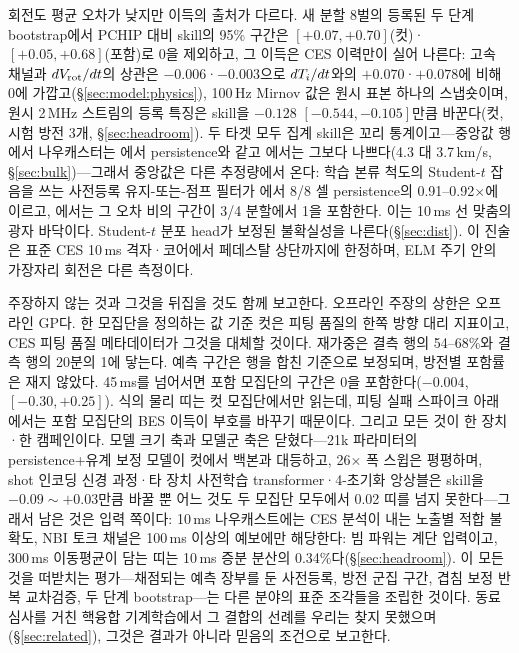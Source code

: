 \documentclass[10pt,a4paper]{article}
\begin{document}
회전도 평균 오차가 낮지만 이득의 출처가 다르다. 새 분할 8벌의 등록된 두 단계
bootstrap에서 PCHIP 대비 skill의 95\% 구간은 $[+0.07, +0.70]$(컷)·$[+0.05, +0.68]$(포함)로
0을 제외하고, 그 이득은 CES 이력만이 실어 나른다: 고속 채널과 $dV_\mathrm{rot}/dt$의 상관은
$-0.006$·$-0.003$으로 $dT_i/dt$와의 $+0.070$·$+0.078$에 비해 0에
가깝고(\S\ref{sec:model:physics}), 100\,Hz Mirnov 값은 원시 표본 하나의 스냅숏이며,
원시 2\,MHz 스트림의 등록 특징은 skill을 $-0.128$ $[-0.544, -0.105]$만큼
바꾼다(컷, 시험 방전 3개, \S\ref{sec:headroom}). 두 타겟 모두 집계 skill은 꼬리
통계이고---중앙값 행에서 나우캐스터는 \Ti{}에서 persistence와 같고 \Vrot{}에서는
그보다 나쁘다(4.3 대 3.7\,km/s, \S\ref{sec:bulk})---그래서 중앙값은 다른 추정량에서
온다: 학습 본류 척도의 Student-$t$ 잡음을 쓰는 사전등록 유지-또는-점프 필터가 \Ti{}에서 8/8 셀 persistence의 0.91--0.92$\times$에 이르고, \Vrot{}에서는 그 오차 비의 구간이 3/4
분할에서 1을 포함한다. 이는 10\,ms 선 맞춤의 광자 바닥이다. Student-$t$ 분포 head가 보정된 불확실성을 나른다(\S\ref{sec:dist}). 이
진술은 표준 CES 10\,ms 격자·코어에서 페데스탈 상단까지에 한정하며, ELM 주기 안의
가장자리 회전은 다른 측정이다.

주장하지 않는 것과 그것을 뒤집을 것도 함께 보고한다. 오프라인 주장의 상한은 오프라인
GP다. 한 모집단을 정의하는 값 기준 컷은 피팅 품질의 한쪽 방향 대리 지표이고, CES 피팅
품질 메타데이터가 그것을 대체할 것이다. 재가중은 결측 \Ti{} 행의 54--68\%와 결측
\Vrot{} 행의 20분의 1에 닿는다. 예측 구간은 행을 합친 기준으로 보정되며, 방전별 포함률은 재지 않았다.
45\,ms를 넘어서면 포함 모집단의 구간은 0을 포함한다($-0.004$, $[-0.30, +0.25]$). 식의
물리 띠는 컷 모집단에서만 읽는데, 피팅 실패 스파이크 아래에서는 포함 모집단의 BES
이득이 부호를 바꾸기 때문이다. 그리고 모든 것이 한 장치·한 캠페인이다. 모델 크기
축과 모델군 축은 닫혔다---21k 파라미터의 persistence+유계 보정 모델이 컷에서 백본과
대등하고, 26$\times$ 폭 스윕은 평평하며, shot 인코딩 신경 과정·타 장치 사전학습
transformer·4-초기화 앙상블은 \Ti{} skill을 $-0.09\sim+0.03$만큼 바꿀 뿐 어느 것도 두
모집단 모두에서 0.02 띠를 넘지 못한다---그래서 남은 것은 입력 쪽이다: 10\,ms 나우캐스트에는 CES 분석이
내는 노출별 적합 불확도, NBI 토크 채널은 100\,ms 이상의 예보에만 해당한다: 빔 파워는
계단 입력이고, 300\,ms 이동평균이 담는 띠는 10\,ms \Vrot{} 증분 분산의 0.34\%다(\S\ref{sec:headroom}). 이 모든 것을 떠받치는
평가---채점되는 예측 장부를 둔 사전등록, 방전 군집 구간, 겹침 보정 반복 교차검증, 두
단계 bootstrap---는 다른 분야의 표준 조각들을 조립한 것이다. 동료 심사를 거친 핵융합
기계학습에서 그 결합의 선례를 우리는 찾지 못했으며(\S\ref{sec:related}), 그것은 결과가
아니라 믿음의 조건으로 보고한다.
\end{document}

